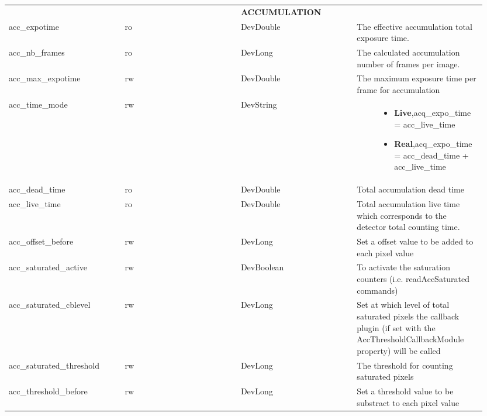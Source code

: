 \documentclass[letterpaper,10pt,english]{sphinxmanual}
\begin{document}
\begin{longtable}{|p{0.237\linewidth}|p{0.237\linewidth}|p{0.237\linewidth}|p{0.237\linewidth}|}
 & 

 & 

 & 

\\
\hline

 & 

 & 
\textbf{ACCUMULATION}
 & 

\\
\hline
acc\_expotime
 & 
ro
 & 
DevDouble
 & 
The effective accumulation total exposure time.
\\
\hline
acc\_nb\_frames
 & 
ro
 & 
DevLong
 & 
The calculated accumulation number of frames per image.
\\
\hline
acc\_max\_expotime
 & 
rw
 & 
DevDouble
 & 
The maximum exposure time per frame for accumulation
\\
\hline
acc\_time\_mode
 & 
rw
 & 
DevString
 & \begin{description}
\item[{Accumulation time mode:}] \leavevmode\begin{itemize}
\item {} 
\textbf{Live},acq\_expo\_time = acc\_live\_time

\item {} 
\textbf{Real},acq\_expo\_time = acc\_dead\_time + acc\_live\_time

\end{itemize}

\end{description}
\\
\hline
acc\_dead\_time
 & 
ro
 & 
DevDouble
 & 
Total accumulation dead time
\\
\hline
acc\_live\_time
 & 
ro
 & 
DevDouble
 & 
Total accumulation live time which corresponds to the
detector total counting time.
\\
\hline
acc\_offset\_before
 & 
rw
 & 
DevLong
 & 
Set a offset value to be added to each pixel value
\\
\hline
acc\_saturated\_active
 & 
rw
 & 
DevBoolean
 & 
To activate the saturation counters (i.e. readAccSaturated commands)
\\
\hline
acc\_saturated\_cblevel
 & 
rw
 & 
DevLong
 & 
Set at which level of total saturated pixels the callback plugin (if set with the AccThresholdCallbackModule property) will be called
\\
\hline
acc\_saturated\_threshold
 & 
rw
 & 
DevLong
 & 
The threshold for counting saturated pixels
\\
\hline
acc\_threshold\_before
 & 
rw
 & 
DevLong
 & 
Set a threshold value to be substract to each pixel value
\\
\hline


\end{longtable}
\end{document}
